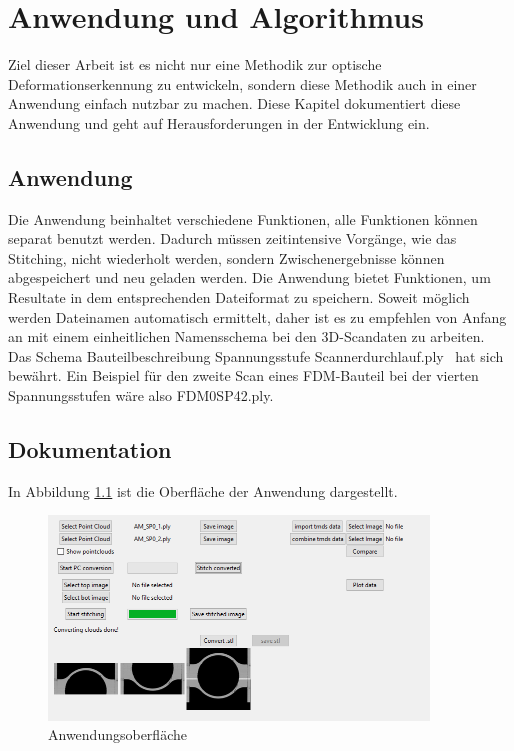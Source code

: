 
\chapter{Anwendung und Algorithmus}

Ziel dieser Arbeit ist es nicht nur eine Methodik zur optische 
Deformationserkennung zu entwickeln, sondern diese Methodik auch in einer 
Anwendung einfach nutzbar zu machen. 
Diese Kapitel dokumentiert diese Anwendung und geht auf Herausforderungen 
in der Entwicklung ein.

\section{Anwendung}

Die Anwendung beinhaltet verschiedene Funktionen, alle Funktionen 
können separat benutzt werden. Dadurch müssen zeitintensive Vorgänge, wie das Stitching,
nicht wiederholt werden, sondern Zwischenergebnisse können abgespeichert und 
neu geladen werden.
Die Anwendung bietet Funktionen, um Resultate in dem entsprechenden Dateiformat zu 
speichern. Soweit möglich werden Dateinamen automatisch ermittelt, 
daher ist es zu empfehlen von Anfang an mit einem einheitlichen Namensschema bei
den 3D-Scandaten zu arbeiten. 
Das Schema \glqq Bauteilbeschreibung \textunderscore Spannungsstufe
\textunderscore Scannerdurchlauf.ply\grqq~
hat sich bewährt. Ein Beispiel für den zweite Scan eines FDM-Bauteil bei der
vierten Spannungsstufen wäre also \glqq FDM0\textunderscore SP4\textunderscore 2.ply\grqq.

\newpage
\section{Dokumentation}

In Abbildung \ref{fig:software_screenshot} ist die Oberfläche der Anwendung dargestellt.

\begin{figure}[H]
    \centering
    \includegraphics[width=0.9\textwidth]{images/software_screenshot2.png}
    \caption{Anwendungsoberfläche}
    \label{fig:software_screenshot}
\end{figure}

